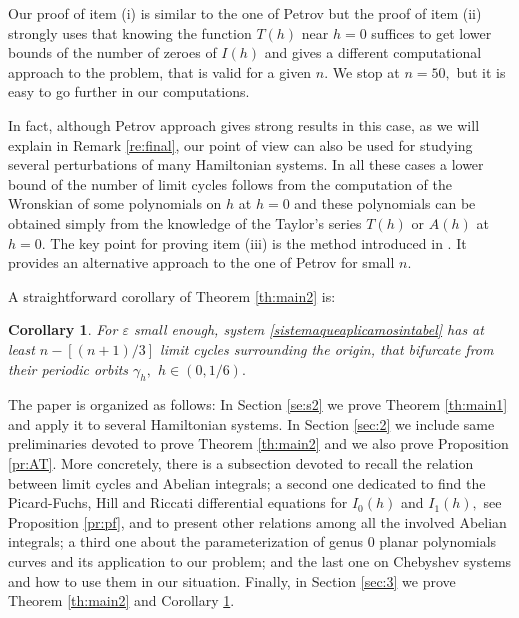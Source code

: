 \documentclass[12pt,a4paper,reqno]{amsart}
\newtheorem{cor}[teo]{Corollary}
\begin{document}
Our proof of item (i) is similar to the one of Petrov but the proof
of item (ii) strongly uses that knowing the function $T(h)$ near
$h=0$ suffices to get lower bounds of the number of zeroes of $I(h)$
and gives a different computational approach to the problem, that is
valid for a given $n$.  We stop at $n=50,$ but  it is easy to
go further in our computations.

In fact, although Petrov approach gives strong results in this case,
as we will explain in Remark \ref{re:final}, our point of view can
also be used for studying  several perturbations of many Hamiltonian
systems. In all these cases a lower bound of the number of limit
cycles follows from the computation of the Wronskian of some
polynomials on $h$ at $h=0$ and these polynomials can be obtained
simply from the knowledge of the Taylor's series $T(h)$ or $A(h)$ at
$h=0.$ The key point for proving item (iii) is the method introduced
in \cite{GraManVil2011,ManVil2002}. It provides an alternative
approach to the one of Petrov for small $n.$


A straightforward corollary of Theorem \ref{th:main2} is:

    \begin{cor}\label{corolcotamaxima01} For $\varepsilon$ small enough, system \eqref{sistemaqueaplicamosintabel}
has at least $n-[(n+1)/3]$ limit cycles surrounding the origin, that
bifurcate from their periodic orbits $\gamma_h,$ $h\in(0,1/6).$
    \end{cor}



    The paper is organized as follows: In Section \ref{se:s2} we
    prove Theorem \ref{th:main1} and apply it to several Hamiltonian
    systems. In Section \ref{sec:2} we include same preliminaries
    devoted to prove Theorem \ref{th:main2} and we also prove Proposition
    \ref{pr:AT}. More concretely, there
    is a subsection devoted to recall the relation between limit cycles and Abelian integrals; a second
    one dedicated to find the Picard-Fuchs, Hill and Riccati
    differential equations for  $I_0(h)$ and $I_1(h),$ see Proposition
    \ref{pr:pf}, and
    to present other relations among all the involved Abelian integrals; a third
    one about the parameterization of genus 0 planar polynomials
    curves and its application to our problem; and the last one on Chebyshev systems and how to use them in our
    situation. Finally, in Section \ref{sec:3} we prove  Theorem \ref{th:main2} and Corollary \ref{corolcotamaxima01}.
\end{document}
